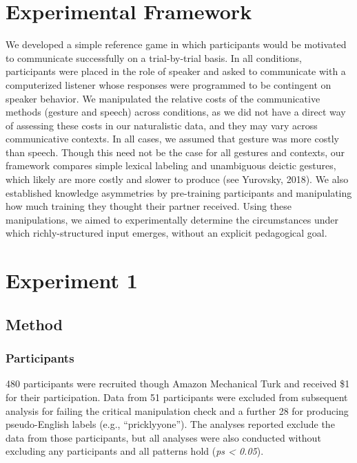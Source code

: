 \documentclass[english,,man,floatsintext]{apa6}
\begin{document}
\hypertarget{experimental-framework}{%
\section{Experimental Framework}\label{experimental-framework}}

We developed a simple reference game in which participants would be motivated to communicate successfully on a trial-by-trial basis. In all conditions, participants were placed in the role of speaker and asked to communicate with a computerized listener whose responses were programmed to be contingent on speaker behavior. We manipulated the relative costs of the communicative methods (gesture and speech) across conditions, as we did not have a direct way of assessing these costs in our naturalistic data, and they may vary across communicative contexts. In all cases, we assumed that gesture was more costly than speech. Though this need not be the case for all gestures and contexts, our framework compares simple lexical labeling and unambiguous deictic gestures, which likely are more costly and slower to produce (see Yurovsky, 2018). We also established knowledge asymmetries by pre-training participants and manipulating how much training they thought their partner received. Using these manipulations, we aimed to experimentally determine the circumstances under which richly-structured input emerges, without an explicit pedagogical goal.

\hypertarget{experiment-1}{%
\section{Experiment 1}\label{experiment-1}}

\hypertarget{method}{%
\subsection{Method}\label{method}}

\hypertarget{participants-1}{%
\subsubsection{Participants}\label{participants-1}}

480 participants were recruited though Amazon Mechanical Turk and received \$1 for their participation. Data from 51 participants were excluded from subsequent analysis for failing the critical manipulation check and a further 28 for producing pseudo-English labels (e.g., \enquote{pricklyyone}). The analyses reported exclude the data from those participants, but all analyses were also conducted without excluding any participants and all patterns hold (\emph{ps \textless{} 0.05}).
\end{document}
